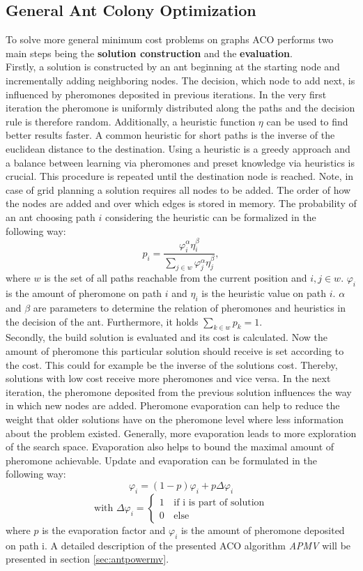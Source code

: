 \subsection{General Ant Colony Optimization}
To solve more general minimum cost problems on graphs ACO performs two main steps being the \textbf{solution construction} and the \textbf{evaluation}.\\
Firstly, a solution is constructed by an ant beginning at the starting node and incrementally adding neighboring nodes. The decision, which node to add next, is influenced by pheromones deposited in previous iterations. In the very first iteration the pheromone is uniformly distributed along the paths and the decision rule is therefore random. Additionally, a heuristic function $\eta$ can be used to find better results faster. A common heuristic for short paths is the inverse of the euclidean distance to the destination. Using a heuristic is a greedy approach and a balance between learning via pheromones and preset knowledge via heuristics is crucial. This procedure is repeated until the destination node is reached. Note, in case of grid planning a solution requires all nodes to be added. The order of how the nodes are added and over which edges is stored in memory.
The probability of an ant choosing path $i$ considering the heuristic can be formalized in the following way:
$$p_i = \frac{\varphi_i^\alpha\eta_i^\beta}{\sum_{j\in{w}}\varphi_j^\alpha\eta_j^\beta},$$
where $w$ is the set of all paths reachable from the current position and $i,j \in w$. $\varphi_i$ is the amount of pheromone on path $i$ and $\eta_i$ is the heuristic value on path $i$. $\alpha$ and $\beta$ are parameters to determine the relation of pheromones and heuristics in the decision of the ant. Furthermore, it holds $\sum_{k\in{w}}p_k = 1$. \\
Secondly, the build solution is evaluated and its cost is calculated. Now the amount of pheromone this particular solution should receive is set according to the cost. This could for example be the inverse of the solutions cost. Thereby, solutions with low cost receive more pheromones and vice versa. In the next iteration, the pheromone deposited from the previous solution influences the way in which new nodes are added. Pheromone evaporation can help to reduce the weight that older solutions have on the pheromone level where less information about the problem existed. Generally, more evaporation leads to more exploration of the search space. Evaporation also helps to bound the maximal amount of pheromone achievable. Update and evaporation can be formulated in the following way:
$$\varphi_i = (1-p)\varphi_i + p\Delta\varphi_i$$
$$\text{with } \Delta\varphi_i = \begin{cases}
	1 & \, \text{if i is part of solution}\\
	0 & \, \text{else}
\end{cases}$$
where $p$ is the evaporation factor and $\varphi_i$ is the amount of pheromone deposited on path i.
A detailed description of the presented ACO algorithm \textit{APMV} will be presented in section \ref{sec:antpowermv}.


